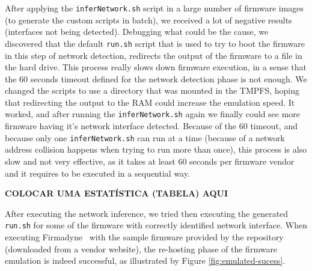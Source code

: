 After applying the {\tt inferNetwork.sh} script in a large number of firmware images (to generate the custom scripts in batch), we received a lot of negative results (interfaces not being detected). Debugging what could be the cause, we discovered that the default {\tt run.sh} script that is used to try to boot the firmware in this step of network detection, redirects the output of the firmware to a file in the hard drive. This process really slows down firmware execution, in a sense that the 60 seconds timeout defined for the network detection phase is not enough. We changed the scripts to use a directory that was mounted in the TMPFS, hoping that redirecting the output to the RAM could increase the emulation speed. It worked, and after running the {\tt inferNetwork.sh} again we finally could see more firmware having it's network interface detected. Because of the 60 timeout, and because only one {\tt inferNetwork.sh} can run at a time (because of a network address collision happens when trying to run more than once), this process is also slow and not very effective, as it takes at least 60 seconds per firmware vendor and it requires to be executed in a sequential way.

\textbf{COLOCAR UMA ESTATÍSTICA (TABELA) AQUI}


After executing the network inference, we tried then executing the generated {\tt run.sh} for some of the firmware with correctly identified network interface. When executing Firmadyne~\cite{firmadyne} with the sample firmware provided by the repository (downloaded from a vendor website), the re-hosting phase of the firmware emulation is indeed successful, as illustrated by Figure \ref{fig:emulated-sucess}.

